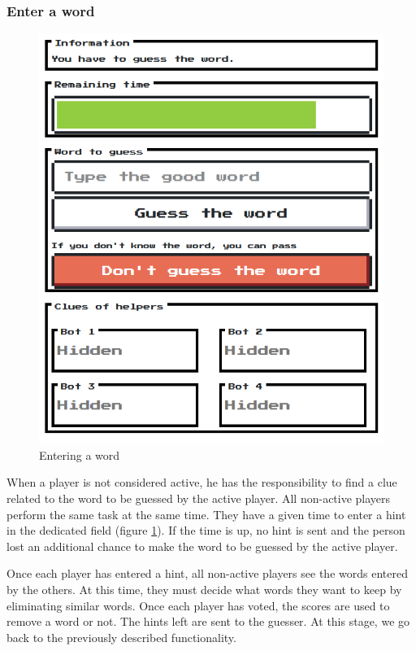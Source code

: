 \documentclass{tnreport}
\begin{document}
\subsubsection{Enter a word}

\begin{figure}
	\centering
	\includegraphics[scale=0.4]{figures/guessing_word}
	\vspace*{-0.1cm}
	\caption{Entering a word}
	\label{fig:entering_word}
\end{figure}

When a player is not considered active, he has the responsibility to find a clue related to the word to be guessed by the active player. All non-active players perform the same task at the same time. They have a given time to enter a hint in the dedicated field (figure \ref{fig:entering_word}). If the time is up, no hint is sent and the person lost an additional chance to make the word to be guessed by the active player. 

Once each player has entered a hint, all non-active players see the words entered by the others. At this time, they must decide what words they want to keep by eliminating similar words. Once each player has voted, the scores are used to remove a word or not. The hints left are sent to the guesser. At this stage, we go back to the previously described functionality. 
\end{document}
